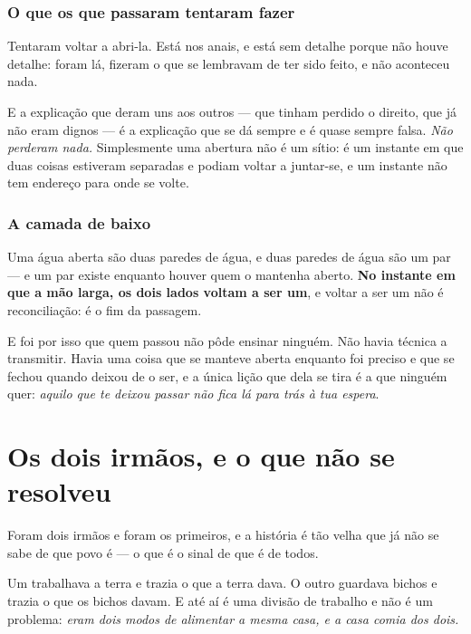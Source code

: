 \documentclass[livro.tex]{subfiles}
\begin{document}
\subsection*{O que os que passaram tentaram fazer}

Tentaram voltar a abri-la. Está nos anais, e está sem detalhe porque não houve detalhe: foram lá,
fizeram o que se lembravam de ter sido feito, e não aconteceu nada.

\medskip

E a explicação que deram uns aos outros --- que tinham perdido o direito, que já não eram dignos
--- é a explicação que se dá sempre e é quase sempre falsa. \emph{Não perderam nada.} Simplesmente
uma abertura não é um sítio: é um instante em que duas coisas estiveram separadas e podiam voltar
a juntar-se, e um instante não tem endereço para onde se volte.

\subsection*{A camada de baixo}

Uma água aberta são duas paredes de água, e duas paredes de água são um par --- e um par existe
enquanto houver quem o mantenha aberto. \textbf{No instante em que a mão larga, os dois lados
voltam a ser um}, e voltar a ser um não é reconciliação: é o fim da passagem.

\medskip

E foi por isso que quem passou não pôde ensinar ninguém. Não havia técnica a transmitir. Havia
uma coisa que se manteve aberta enquanto foi preciso e que se fechou quando deixou de o ser, e a
única lição que dela se tira é a que ninguém quer: \emph{aquilo que te deixou passar não fica lá
para trás à tua espera}.

\chapter{Os dois irmãos, e o que não se resolveu}

Foram dois irmãos e foram os primeiros, e a história é tão velha que já não se sabe de que povo é
--- o que é o sinal de que é de todos.

\medskip

Um trabalhava a terra e trazia o que a terra dava. O outro guardava bichos e trazia o que os
bichos davam. E até aí é uma divisão de trabalho e não é um problema: \emph{eram dois modos de
alimentar a mesma casa, e a casa comia dos dois.}
\end{document}
